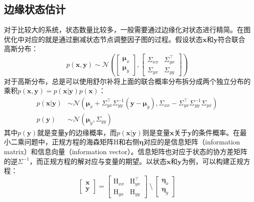 \subsection{边缘状态估计}

对于比较大的系统，状态数量比较多，一般需要通过边缘化对状态进行精简。在图优化中对应的就是通过删减状态节点调整因子图的过程。假设状态$\bm{x}$和$\bm{y}$符合联合高斯分布：
\begin{equation}
p(\bm{x},\bm{y}) \sim \mathcal{N}
\left(
    \begin{bmatrix} \bm{\mu}_x \\ \bm{\mu}_y \end{bmatrix},
    \begin{bmatrix}
        \Sigma_{xx} & \Sigma_{yx}^\top \\
        \Sigma_{yx} & \Sigma_{yy}
    \end{bmatrix}
    \label{eq:joint}
\right)
\end{equation}
对于高斯分布，总是可以使用舒尔补将上面的联合概率分布拆分成两个独立分布的乘积$p(\bm{x},\bm{y})=p(\bm{x}|\bm{y})p(\bm{x})$：
\begin{equation}
\begin{aligned}
    p(\bm{x}|\bm{y}) &\sim \mathcal{N}(
        \bm{\mu}_x+\Sigma_{yx}^\top\Sigma_{yy}^{-1}(\bm{y}-\bm{\mu}_y),
        \Sigma_{xx}-\Sigma_{yx}^\top\Sigma_{yy}^{-1}\Sigma_{yx}) \\
    p(\bm{y}) &\sim \mathcal{N}(\bm{\mu}_y,\Sigma_{yy})
\end{aligned}
\label{eq:indep}
\end{equation}
其中$p(\bm{y})$就是变量$\bm{y}$的边缘概率，而$p(\bm{x}|\bm{y})$则是变量$\bm{x}$关于$\bm{y}$的条件概率。在最小二乘问题中，正规方程的海森矩阵$\mathrm{H}$和右侧$\bm{\eta}$对应的是信息矩阵（information matrix）和信息向量（information vector）\citep{barfoot2017state}。信息矩阵也对应于状态的协方差矩阵的逆$\Sigma^{-1}$，而正规方程的解对应与变量的期望。以状态$\bm{x}$和$\bm{y}$为例，可以构建正规方程：
\begin{equation}
\begin{bmatrix} \bm{x} \\ \bm{y} \end{bmatrix} =
\begin{bmatrix}
    \mathrm{H}_{xx} & \mathrm{H}_{yx}^\top \\
    \mathrm{H}_{yx} & \mathrm{H}_{yy}
\end{bmatrix} \:\setminus\:
\begin{bmatrix} \bm{\eta}_x \\ \bm{\eta}_y \end{bmatrix}
\end{equation}
